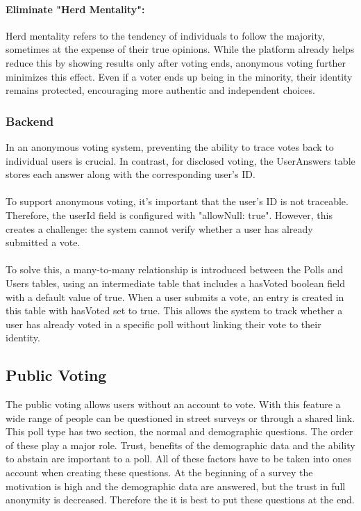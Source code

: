 \documentclass[a4paper,12pt]{report}
\begin{document}
\paragraph{Eliminate "Herd Mentality":}
Herd mentality refers to the tendency of individuals to follow the majority, sometimes at the expense of their true opinions. While the platform already helps reduce this by showing results only after voting ends, anonymous voting further minimizes this effect. Even if a voter ends up being in the minority, their identity remains protected, encouraging more authentic and independent choices.  \parencite{disvsanon}

\subsubsection{Backend}
In an anonymous voting system, preventing the ability to trace votes back to individual users is crucial. In contrast, for disclosed voting, the UserAnswers table stores each answer along with the corresponding user's ID.\\ \\
To support anonymous voting, it's important that the user's ID is not traceable. Therefore, the userId field is configured with "allowNull: true". However, this creates a challenge: the system cannot verify whether a user has already submitted a vote.\\ \\
To solve this, a many-to-many relationship is introduced between the Polls and Users tables, using an intermediate table that includes a hasVoted boolean field with a default value of true. When a user submits a vote, an entry is created in this table with hasVoted set to true. This allows the system to track whether a user has already voted in a specific poll without linking their vote to their identity.

\subsection{Public Voting}
The public voting allows users without an account to vote. With this feature a wide range of people can be questioned in street surveys or through a shared link. This poll type has two section, the normal and demographic questions. The order of these play a major role. Trust, benefits of the demographic data and the ability to abstain are important to a poll. All of these factors have to be taken into ones account when creating these questions. At the beginning of a survey the motivation is high and the demographic data are answered, but the trust in full anonymity is decreased. Therefore the it is best to put these questions at the end. \cite{demographicdata}
\end{document}
